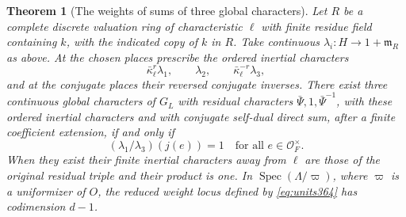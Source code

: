 \documentclass[a4paper,11pt]{article}
\newtheorem{theorem}[proposition]{Theorem}
\theoremstyle{definition}
\theoremstyle{remark}
\numberwithin{equation}{section}
\begin{document}
\begin{theorem}[The weights of sums of three global characters]
\label{thm:unitweights364}
Let \(R\) be a complete discrete valuation ring of characteristic
\(\ell\) with finite residue field containing \(k\), with the
indicated copy of \(k\) in \(R\). Take continuous
\(\lambda_i:H\to1+\mathfrak m_R\) as above. At the chosen
places prescribe the ordered inertial characters
\[
 \bar\kappa_\ell^r\lambda_1,\qquad \lambda_2,\qquad
 \bar\kappa_\ell^{-r}\lambda_3 ,
\]
and at the conjugate places their reversed conjugate inverses.
There exist three continuous global characters of \(G_L\)
with residual characters \(\bar\Psi,1,\bar\Psi^{-1}\), with
these ordered inertial characters and with conjugate self-dual
direct sum, after a finite coefficient extension, if and only if
\begin{equation}
             (\lambda_1/\lambda_3)(j(e))=1
                      \quad\text{for all } e\in\mathcal O_F^\times .
                                                        \label{eq:units364}
\end{equation}
When they exist their finite inertial characters away from
\(\ell\) are those of the original residual triple and their
product is one. In \(\operatorname{Spec}(\Lambda/\varpi)\),
where \(\varpi\) is a uniformizer of \(O\), the reduced weight
locus defined by \eqref{eq:units364} has codimension \(d-1\).
\end{theorem}
\end{document}
